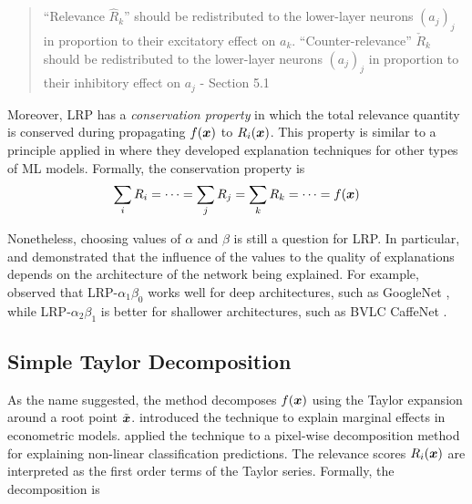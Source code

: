 \begin{quote}
``Relevance $\hat{R}_k$'' should be redistributed to the lower-layer neurons $(a_j)_j$ in proportion to their excitatory effect on $a_k$. ``Counter-relevance'' $\check{R}_k $ should be redistributed to the lower-layer neurons $(a_j)_j$ in proportion to their inhibitory effect on $a_j$
	- Section 5.1 \citep{MontavonMethodsinterpretingunderstanding2018}
\end{quote} 

Moreover, LRP  has a \textit{conservation property} in which the total relevance quantity is conserved during propagating $f(\patvector{x})$ to $R_i(\boldsymbol{x})$. This property is similar to a principle applied in \citep{PoulinVisualExplanationEvidence2006,LandeckerInterpretingindividualclassifications2013} where they developed explanation techniques for other types of ML models. Formally, the conservation property is 
\begin{align*}
	\sum_{i} R_i =  \cdots =	\sum_{j} R_j = \sum_{k} R_k = \cdots = f(\patvector{x})
\end{align*}

Nonetheless, choosing values of $\alpha$ and $\beta$ is still a question for LRP.  In particular, \citet{MontavonExplainingnonlinearclassification2017} and \citet{BinderLayerWiseRelevancePropagation2016} demonstrated that the influence of the values to the quality of explanations  depends on the architecture of the network being explained. For example, \cite{MontavonMethodsinterpretingunderstanding2018} observed that LRP-${\alpha_1\beta_0}$ works well for deep architectures, such as GoogleNet \citep{SzegedyGoingdeeperconvolutions2015}, while LRP-${\alpha_2\beta_1}$ is better for shallower architectures, such as BVLC CaffeNet \citep{JiaCaffeConvolutionalArchitecture2014}.

\subsection{Simple Taylor Decomposition}
As the name suggested,  the method decomposes $f(\patvector{x})$ using the Taylor expansion around a root point $\tilde{\patvector{x}}$. \citet{BazenTaylorDecompositionUnified2013} introduced  the technique to explain marginal effects in econometric models. \citet{BachPixelWiseExplanationsNonLinear2015} applied the technique to a pixel-wise decomposition method for explaining non-linear classification predictions. The relevance scores $R_i(\boldsymbol{x})$ are interpreted as the first order terms of the Taylor series. Formally, the decomposition is 


